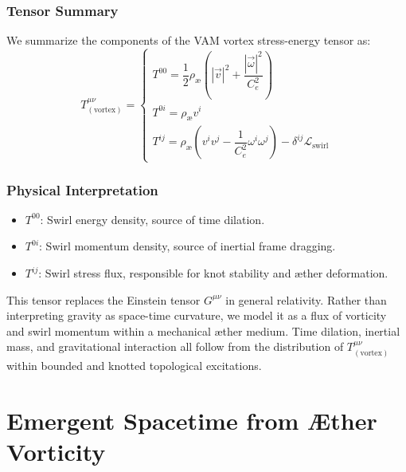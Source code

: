 \documentclass[12pt]{article}
\begin{document}
    \subsubsection*{Tensor Summary}

    We summarize the components of the VAM vortex stress-energy tensor as:
    \begin{equation}
        \boxed{
            T^{\mu\nu}_{(\text{vortex})} =
            \begin{cases}
                T^{00} = \dfrac{1}{2} \rho_\text{\ae} \left( |\vec{v}|^2 + \dfrac{|\vec{\omega}|^2}{C_e^2} \right) \\[6pt]
                T^{0i} = \rho_\text{\ae} v^i \\[6pt]
                T^{ij} = \rho_\text{\ae} \left( v^i v^j - \dfrac{1}{C_e^2} \omega^i \omega^j \right) - \delta^{ij} \mathcal{L}_{\text{swirl}}
            \end{cases}
        }
    \end{equation}

    \subsubsection*{Physical Interpretation}

    \begin{itemize}[leftmargin=1.5em]
        \item \( T^{00} \): Swirl energy density, source of time dilation.
        \item \( T^{0i} \): Swirl momentum density, source of inertial frame dragging.
        \item \( T^{ij} \): Swirl stress flux, responsible for knot stability and æther deformation.
    \end{itemize}

    This tensor replaces the Einstein tensor \( G^{\mu\nu} \) in general relativity. Rather than interpreting gravity as space-time curvature, we model it as a flux of vorticity and swirl momentum within a mechanical æther medium. Time dilation, inertial mass, and gravitational interaction all follow from the distribution of \( T^{\mu\nu}_{(\text{vortex})} \) within bounded and knotted topological excitations.


    \section{Emergent Spacetime from Æther Vorticity}
    \label{sec:spacetime_emergence}
\end{document}
